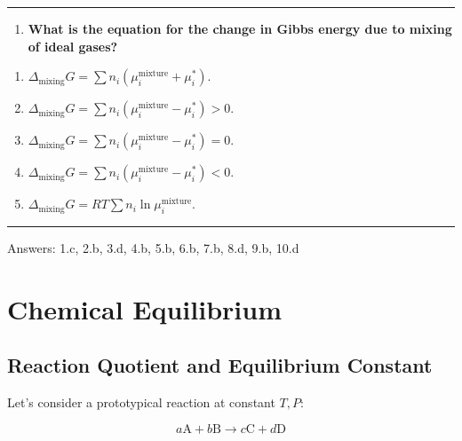 \documentclass[
  9pt,
]{extbook}
\providecommand{\tightlist}{%
  \setlength{\itemsep}{0pt}\setlength{\parskip}{0pt}}
\theoremstyle{definition}
\theoremstyle{definition}
\theoremstyle{definition}
\theoremstyle{definition}
\theoremstyle{remark}
\begin{document}
\begin{center}\rule{0.5\linewidth}{0.5pt}\end{center}

\begin{enumerate}
\def\labelenumi{\arabic{enumi}.}
\setcounter{enumi}{9}
\tightlist
\item
  \textbf{What is the equation for the change in Gibbs energy due to mixing of ideal gases?}
\end{enumerate}

\begin{enumerate}
\def\labelenumi{\alph{enumi}.}
\tightlist
\item
  \(\Delta_{\text{mixing}}G = \sum n_i(\mu_i^{\text{mixture}} + \mu_i^*)\).
\item
  \(\Delta_{\text{mixing}}G = \sum n_i(\mu_i^{\text{mixture}} - \mu_i^*) > 0\).
\item
  \(\Delta_{\text{mixing}}G = \sum n_i(\mu_i^{\text{mixture}} - \mu_i^*) = 0\).
\item
  \(\Delta_{\text{mixing}}G = \sum n_i(\mu_i^{\text{mixture}} - \mu_i^*) < 0\).
\item
  \(\Delta_{\text{mixing}}G = RT\sum n_i\ln\mu_i^{\text{mixture}}\).
\end{enumerate}

\begin{center}\rule{0.5\linewidth}{0.5pt}\end{center}

Answers: 1.c, 2.b, 3.d, 4.b, 5.b, 6.b, 7.b, 8.d, 9.b, 10.d

\renewcommand*{\standardstate}{{-\kern-6pt{\ominus}\kern-6pt-}}

\chapter{Chemical Equilibrium}\label{ChemicalEquilibrium}

\section{Reaction Quotient and Equilibrium Constant}\label{reaction-quotient-and-equilibrium-constant}

Let's consider a prototypical reaction at constant \(T,P\):

\begin{equation}
 a\mathrm{A} + b\mathrm{B} \rightarrow c\mathrm{C} + d\mathrm{D} 
\label{eq:reaction4}
\end{equation}
\end{document}
